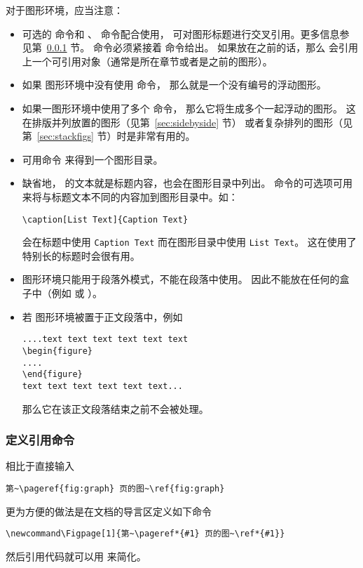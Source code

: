 对于图形环境，应当注意：
\begin{itemize}
	\item 可选的  命令和 、 命令配合使用，
	可对图形标题进行交叉引用。更多信息参见第~\ref{sssec:refcmd} 节。
	 命令必须紧接着  命令给出。
	如果放在之前的话，那么  会引用上一个可引用对象（通常是所在章节或者是之前的图形）。
	
	\item 如果  图形环境中没有使用  命令，
	那么就是一个没有编号的浮动图形。
	
	\item 如果一图形环境中使用了多个  命令，
	那么它将生成多个一起浮动的图形。
	这在排版并列放置的图形（见第~\ref{sec:sidebyside} 节）
	或者复杂排列的图形（见第~\ref{sec:stackfigs} 节）时是非常有用的。
	
	\item 可用命令  来得到一个图形目录。
	\item 缺省地， 的文本就是标题内容，也会在图形目录中列出。
	 命令的可选项可用来将与标题文本不同的内容加到图形目录中。如：
\begin{lstlisting}
\caption[List Text]{Caption Text}
\end{lstlisting}
	会在标题中使用 \texttt{Caption Text} 而在图形目录中使用 \texttt{List Text}。
	这在使用了特别长的标题时会很有用。
	
	\item {} 图形环境只能用于段落外模式，不能在段落中使用。
	因此不能放在任何的盒子中（例如  或 ）。
	
	\item 若  图形环境被置于正文段落中，例如
\begin{lstlisting}
....text text text text text text 
\begin{figure} 
.... 
\end{figure} 
text text text text text text...      
\end{lstlisting}
	那么它在该正文段落结束之前不会被处理。
\end{itemize}

\subsubsection{定义引用命令}\label{sssec:refcmd}
相比于直接输入
\begin{lstlisting}
第~\pageref{fig:graph} 页的图~\ref{fig:graph}
\end{lstlisting}
更为方便的做法是在文档的导言区定义如下命令
\begin{lstlisting}
\newcommand\Figpage[1]{第~\pageref*{#1} 页的图~\ref*{#1}}
\end{lstlisting}
然后引用代码就可以用  来简化。

